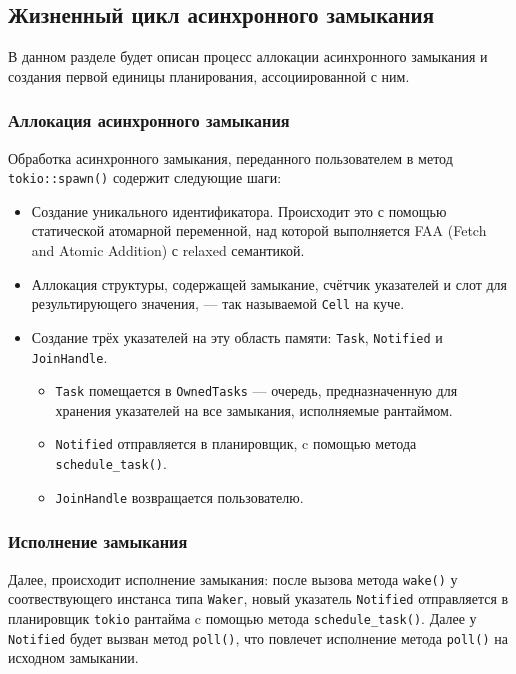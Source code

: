 \subsection{Жизненный цикл асинхронного замыкания}

В данном разделе будет описан процесс аллокации асинхронного замыкания и создания первой единицы планирования, ассоциированной с ним.

\subsubsection{Аллокация асинхронного замыкания}

Обработка асинхронного замыкания, переданного пользователем в метод \verb|tokio::spawn()| содержит следующие шаги:

\begin{itemize}
    \item Создание уникального идентификатора. Происходит это с помощью статической атомарной переменной, над которой выполняется FAA (Fetch and Atomic Addition) с relaxed семантикой.
    \item Аллокация структуры, содержащей замыкание, счётчик указателей и слот для результирующего значения, --- так называемой \verb|Cell| на куче.
    \item Создание трёх указателей на эту область памяти: \verb|Task|, \verb|Notified| и \verb|JoinHandle|.
    \begin{itemize}
        \item \verb|Task| помещается в \verb|OwnedTasks| --- очередь, предназначенную для хранения указателей на все замыкания, исполняемые рантаймом.
        \item \verb|Notified| отправляется в планировщик, c помощью метода \verb|schedule_task()|.
        \item \verb|JoinHandle| возвращается пользователю.
    \end{itemize}
\end{itemize}

\subsubsection{Исполнение замыкания}

Далее, происходит исполнение замыкания: после вызова метода \verb|wake()| у соотвествующего инстанса типа \verb|Waker|, новый указатель \verb|Notified| отправляется в планировщик \verb|tokio| рантайма c помощью метода \verb|schedule_task()|. Далее у \verb|Notified| будет вызван метод \verb|poll()|, что повлечет исполнение метода \verb|poll()| на исходном замыкании.

